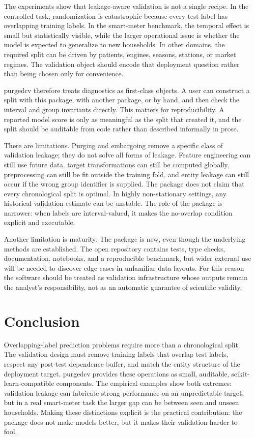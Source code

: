 \documentclass[11pt]{article}
\newcommand{\pcv}{\textsf{purgedcv}}
\newcommand{\pkg}[1]{\textsf{#1}}
\begin{document}
The experiments show that leakage-aware validation is not a single recipe. In
the controlled task, randomization is catastrophic because every test label has
overlapping training labels. In the smart-meter benchmark, the temporal effect
is small but statistically visible, while the larger operational issue is
whether the model is expected to generalize to new households. In other domains,
the required split can be driven by patients, engines, seasons, stations, or
market regimes. The validation object should encode that deployment question
rather than being chosen only for convenience.

\pcv{} therefore treats diagnostics as first-class objects. A user can
construct a split with this package, with another package, or by hand, and then
check the interval and group invariants directly. This matters for
reproducibility. A reported model score is only as meaningful as the split that
created it, and the split should be auditable from code rather than described
informally in prose.

There are limitations. Purging and embargoing remove a specific class of
validation leakage; they do not solve all forms of leakage. Feature engineering
can still use future data, target transformations can still be computed
globally, preprocessing can still be fit outside the training fold, and entity
leakage can still occur if the wrong group identifier is supplied. The package
does not claim that every chronological split is optimal. In highly
non-stationary settings, any historical validation estimate can be unstable. The
role of the package is narrower: when labels are interval-valued, it makes the
no-overlap condition explicit and executable.

Another limitation is maturity. The package is new, even though the underlying
methods are established. The open repository contains tests, type checks,
documentation, notebooks, and a reproducible benchmark, but wider external use
will be needed to discover edge cases in unfamiliar data layouts. For this
reason the software should be treated as validation infrastructure whose outputs
remain the analyst's responsibility, not as an automatic guarantee of scientific
validity.

\section{Conclusion}

Overlapping-label prediction problems require more than a chronological split.
The validation design must remove training labels that overlap test labels,
respect any post-test dependence buffer, and match the entity structure of the
deployment target. \pcv{} provides these operations as small, auditable,
\pkg{scikit-learn}-compatible components. The empirical examples show both
extremes: validation leakage can fabricate strong performance on an
unpredictable target, but in a real smart-meter task the larger gap can be
between seen and unseen households. Making these distinctions explicit is the
practical contribution: the package does not make models better, but it makes
their validation harder to fool.
\end{document}
